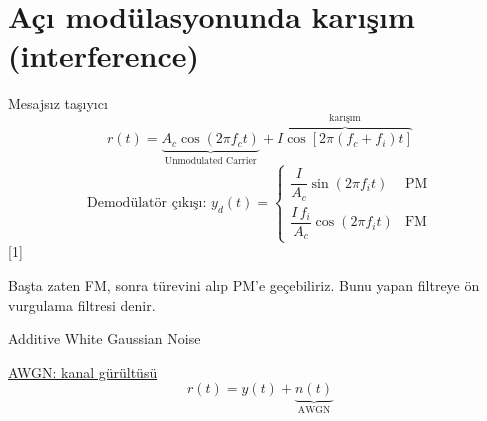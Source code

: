 \documentclass[11pt,a4paper]{article}
\begin{document}
\section{Açı modülasyonunda karışım (interference)}
Mesajsız taşıyıcı
\[
r(t)=\underbrace{A_c\cos(2\pi f_c t)}_{\text{Unmodulated Carrier}}+\overbrace{I\cos[2\pi(f_c+f_i)t]}^{\text{karışım}}
\]
\[
\text{Demodülatör çıkışı: }y_d(t)=\begin{cases}\dfrac{I}{A_c}\sin(2\pi f_i t) & \text{PM}\\[3mm]\dfrac{I\,f_i}{A_c}\cos(2\pi f_i t) & \text{FM}\end{cases}
\]
[1]

Başta zaten FM, sonra türevini alıp PM'e geçebiliriz. Bunu yapan filtreye ön vurgulama filtresi denir.

Additive White Gaussian Noise

\underline{AWGN: kanal gürültüsü}
\[
r(t)=y(t)+\underbrace{n(t)}_{\text{AWGN}}
\]
\end{document}
